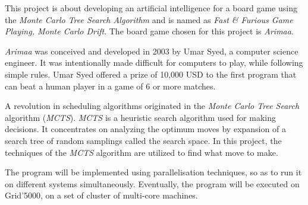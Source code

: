 This project is about developing an artificial intelligence for a board game using the \emph{Monte Carlo Tree Search Algorithm} and is named as \emph{Fast \& Furious Game Playing, Monte Carlo Drift}. The board game chosen for this project is \emph{Arimaa}.
\newline

\emph{Arimaa} was conceived and developed in 2003 by Umar Syed, a computer science engineer. It was intentionally made difficult for computers to play, while following simple rules. Umar Syed offered a prize of 10,000 USD to the first program that can beat a human player in a game of 6 or more matches.
\newline

A revolution in scheduling algorithms originated in the \emph{Monte Carlo Tree Search} algorithm (\emph{MCTS}). \emph{MCTS} is a heuristic search algorithm used for making decisions. It concentrates on analyzing the optimum moves by expansion of a search tree of random samplings called the search space. In this project, the techniques of the \emph{MCTS} algorithm are utilized to find what move to make.
\newline

The program will be implemented using parallelisation techniques, so as to run it on different systems simultaneously. Eventually, the program will be executed on Grid'5000, on a set of cluster of multi-core machines.
